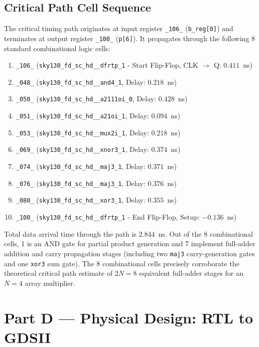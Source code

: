 \documentclass[12pt]{article}
\begin{document}
\subsection{Critical Path Cell Sequence}
The critical timing path originates at input register \texttt{\_106\_} (\texttt{b\_reg[0]}) and terminates at output register \texttt{\_100\_} (\texttt{p[6]}). It propagates through the following 8 standard combinational logic cells:
\begin{enumerate}
    \item \texttt{\_106\_} (\texttt{sky130\_fd\_sc\_hd\_\_dfrtp\_1} - Start Flip-Flop, CLK $\rightarrow$ Q: $0.411$~ns)
    \item \texttt{\_048\_} (\texttt{sky130\_fd\_sc\_hd\_\_and4\_1}, Delay: $0.218$~ns)
    \item \texttt{\_050\_} (\texttt{sky130\_fd\_sc\_hd\_\_a2111oi\_0}, Delay: $0.428$~ns)
    \item \texttt{\_051\_} (\texttt{sky130\_fd\_sc\_hd\_\_a21oi\_1}, Delay: $0.094$~ns)
    \item \texttt{\_053\_} (\texttt{sky130\_fd\_sc\_hd\_\_mux2i\_1}, Delay: $0.218$~ns)
    \item \texttt{\_069\_} (\texttt{sky130\_fd\_sc\_hd\_\_xnor3\_1}, Delay: $0.374$~ns)
    \item \texttt{\_074\_} (\texttt{sky130\_fd\_sc\_hd\_\_maj3\_1}, Delay: $0.371$~ns)
    \item \texttt{\_076\_} (\texttt{sky130\_fd\_sc\_hd\_\_maj3\_1}, Delay: $0.376$~ns)
    \item \texttt{\_080\_} (\texttt{sky130\_fd\_sc\_hd\_\_xor3\_1}, Delay: $0.355$~ns)
    \item \texttt{\_100\_} (\texttt{sky130\_fd\_sc\_hd\_\_dfrtp\_1} - End Flip-Flop, Setup: $-0.136$~ns)
\end{enumerate}
Total data arrival time through the path is $2.844$~ns. Out of the 8 combinational cells, 1 is an AND gate for partial product generation and 7 implement full-adder addition and carry propagation stages (including two \texttt{maj3} carry-generation gates and one \texttt{xor3} sum gate). The 8 combinational cells precisely corroborate the theoretical critical path estimate of $2N = 8$ equivalent full-adder stages for an $N = 4$ array multiplier.

\section{Part D — Physical Design: RTL to GDSII}
\end{document}
